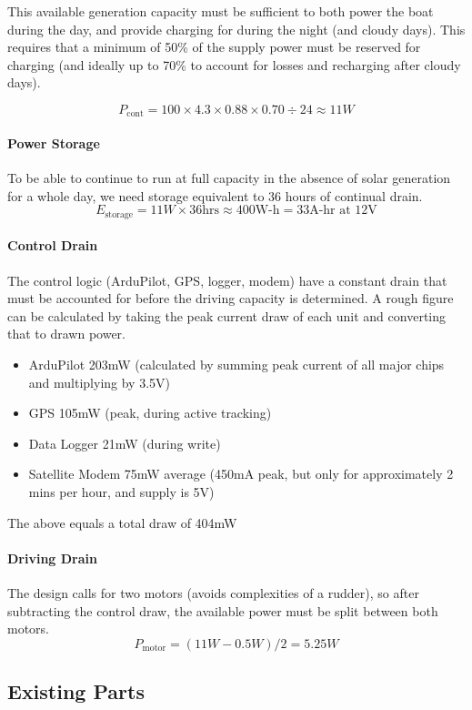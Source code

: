 This available generation capacity must be sufficient to both power the boat during the day, and provide charging for during the night (and cloudy days). This requires that a minimum of 50\% of the supply power must be reserved for charging (and ideally up to 70\% to account for losses and recharging after cloudy days).

$$
P_{\text{cont}} = 100 \times 4.3 \times 0.88 \times 0.70 \div 24 \approx 11W
$$

\paragraph{Power Storage}
To be able to continue to run at full capacity in the absence of solar generation for a whole day, we need storage equivalent to 36 hours of continual drain.
$$
E_{\text{storage}} = 11W \times 36\text{hrs} \approx 400\text{W-h} = 33\text{A-hr at 12V}
$$

\paragraph{Control Drain}
The control logic (ArduPilot, GPS, logger, modem) have a constant drain that must be accounted for before the driving capacity is determined. A rough figure can be calculated by taking the peak current draw of each unit and converting that to drawn power.
\begin{itemize}
\item{ArduPilot} 203mW (calculated by summing peak current of all major chips and multiplying by 3.5V)
\item{GPS} 105mW (peak, during active tracking)
\item{Data Logger} 21mW (during write)
\item{Satellite Modem} 75mW average (450mA peak, but only for approximately 2 mins per hour, and supply is 5V)
\end{itemize}
The above equals a total draw of 404mW

\paragraph{Driving Drain}
The design calls for two motors (avoids complexities of a rudder), so after subtracting the control draw, the available power must be split between both motors.
$$
P_{\text{motor}} = \left(11W - 0.5W\right) / 2 = 5.25W
$$

\subsection{Existing Parts}

